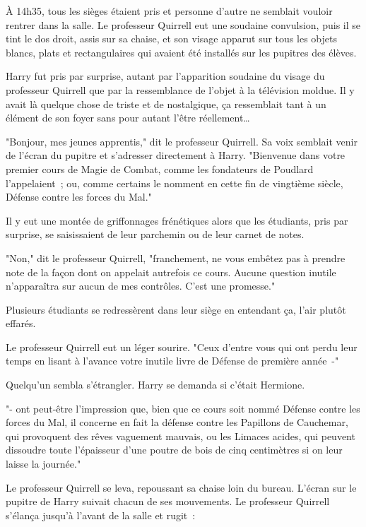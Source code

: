 \later

À 14h35, tous les sièges étaient pris et personne d'autre ne semblait vouloir rentrer dans la salle. Le professeur Quirrell eut une soudaine convulsion, puis il se tint le dos droit, assis sur sa chaise, et son visage apparut sur tous les objets blancs, plats et rectangulaires qui avaient été installés sur les pupitres des élèves.

Harry fut pris par surprise, autant par l'apparition soudaine du visage du professeur Quirrell que par la ressemblance de l'objet à la télévision moldue. Il y avait là quelque chose de triste et de nostalgique, ça ressemblait tant à un élément de son foyer sans pour autant l'être réellement…

"Bonjour, mes jeunes apprentis," dit le professeur Quirrell. Sa voix semblait venir de l'écran du pupitre et s'adresser directement à Harry. "Bienvenue dans votre premier cours de Magie de Combat, comme les fondateurs de Poudlard l'appelaient~; ou, comme certains le nomment en cette fin de vingtième siècle, Défense contre les forces du Mal."

Il y eut une montée de griffonnages frénétiques alors que les étudiants, pris par surprise, se saisissaient de leur parchemin ou de leur carnet de notes.

"Non," dit le professeur Quirrell, "franchement, ne vous embêtez pas à prendre note de la façon dont on appelait autrefois ce cours. Aucune question inutile n'apparaîtra sur aucun de mes contrôles. C'est une promesse."

Plusieurs étudiants se redressèrent dans leur siège en entendant ça, l'air plutôt effarés.

Le professeur Quirrell eut un léger sourire. "Ceux d'entre vous qui ont perdu leur temps en lisant à l'avance votre inutile livre de Défense de première année~-"

Quelqu'un sembla s'étrangler. Harry se demanda si c'était Hermione.

"- ont peut-être l'impression que, bien que ce cours soit nommé Défense contre les forces du Mal, il concerne en fait la défense contre les Papillons de Cauchemar, qui provoquent des rêves vaguement mauvais, ou les Limaces acides, qui peuvent dissoudre toute l'épaisseur d'une poutre de bois de cinq centimètres si on leur laisse la journée."

Le professeur Quirrell se leva, repoussant sa chaise loin du bureau. L'écran sur le pupitre de Harry suivait chacun de ses mouvements. Le professeur Quirrell s'élança jusqu'à l'avant de la salle et rugit~:

